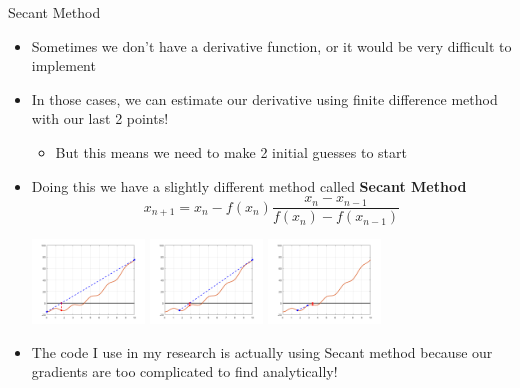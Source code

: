 {}\documentclass[letterpaper,
compress,
xcolor=x11names,
]{beamer}
\begin{document}
\begin{frame}{Secant Method}
	\footnotesize
	\begin{itemize}
		\item Sometimes we don't have a derivative function, or it would be very difficult to implement \item In those cases, we can estimate our derivative using finite difference method with our last 2 points!
		\begin{itemize}
			\item But this means we need to make 2 initial guesses to start
		\end{itemize}
		\item Doing this we have a slightly different method called \textbf{Secant Method}
		\begin{equation*}
			x_{n+1} = x_n - f(x_n)\frac{x_n - x_{n-1}}{f(x_n) - f(x_{n-1})}
		\end{equation*}
		\begin{center}
			\includegraphics[width = 3cm]{secant_1.png} \hspace{0.25cm}
			\includegraphics[width = 3cm]{secant_2.png} \hspace{0.25cm}
			\includegraphics[width = 3cm]{secant_3.png}
		\end{center}
		\item The code I use in my research is actually using Secant method because our gradients are too complicated to find analytically!
	\end{itemize}
\end{frame}
\end{document}
